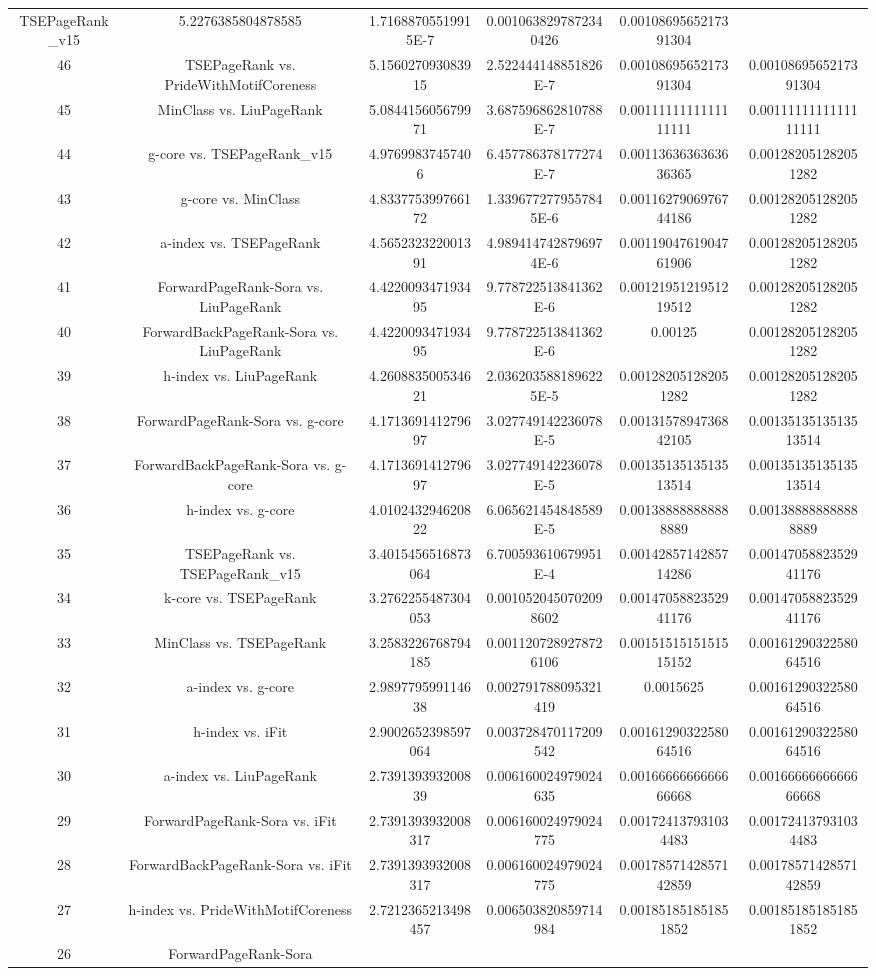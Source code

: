 \documentclass[a4paper,10pt]{article}
\begin{document}
\begin{landscape}
\begin{table}[!htp]
\begin{tabular}{cccccc}
TSEPageRank_v15&5.2276385804878585&1.71688705519915E-7&0.0010638297872340426&0.0010869565217391304\\46&TSEPageRank vs. PrideWithMotifCoreness&5.156027093083915&2.522444148851826E-7&0.0010869565217391304&0.0010869565217391304\\45&MinClass vs. LiuPageRank&5.084415605679971&3.687596862810788E-7&0.0011111111111111111&0.0011111111111111111\\44&g-core vs. TSEPageRank_v15&4.97699837457406&6.457786378177274E-7&0.0011363636363636365&0.001282051282051282\\43&g-core vs. MinClass&4.833775399766172&1.3396772779557845E-6&0.0011627906976744186&0.001282051282051282\\42&a-index vs. TSEPageRank&4.565232322001391&4.9894147428796974E-6&0.0011904761904761906&0.001282051282051282\\41&ForwardPageRank-Sora vs. LiuPageRank&4.422009347193495&9.778722513841362E-6&0.0012195121951219512&0.001282051282051282\\40&ForwardBackPageRank-Sora vs. LiuPageRank&4.422009347193495&9.778722513841362E-6&0.00125&0.001282051282051282\\39&h-index vs. LiuPageRank&4.260883500534621&2.0362035881896225E-5&0.001282051282051282&0.001282051282051282\\38&ForwardPageRank-Sora vs. g-core&4.171369141279697&3.027749142236078E-5&0.0013157894736842105&0.0013513513513513514\\37&ForwardBackPageRank-Sora vs. g-core&4.171369141279697&3.027749142236078E-5&0.0013513513513513514&0.0013513513513513514\\36&h-index vs. g-core&4.010243294620822&6.065621454848589E-5&0.001388888888888889&0.001388888888888889\\35&TSEPageRank vs. TSEPageRank_v15&3.4015456516873064&6.700593610679951E-4&0.0014285714285714286&0.0014705882352941176\\34&k-core vs. TSEPageRank&3.2762255487304053&0.0010520450702098602&0.0014705882352941176&0.0014705882352941176\\33&MinClass vs. TSEPageRank&3.2583226768794185&0.0011207289278726106&0.0015151515151515152&0.0016129032258064516\\32&a-index vs. g-core&2.989779599114638&0.002791788095321419&0.0015625&0.0016129032258064516\\31&h-index vs. iFit&2.9002652398597064&0.003728470117209542&0.0016129032258064516&0.0016129032258064516\\30&a-index vs. LiuPageRank&2.739139393200839&0.006160024979024635&0.0016666666666666668&0.0016666666666666668\\29&ForwardPageRank-Sora vs. iFit&2.7391393932008317&0.006160024979024775&0.001724137931034483&0.001724137931034483\\28&ForwardBackPageRank-Sora vs. iFit&2.7391393932008317&0.006160024979024775&0.0017857142857142859&0.0017857142857142859\\27&h-index vs. PrideWithMotifCoreness&2.7212365213498457&0.006503820859714984&0.001851851851851852&0.001851851851851852\\26&ForwardPageRank-Sora 
\end{tabular}
\end{table}
\end{landscape}
\end{document}
